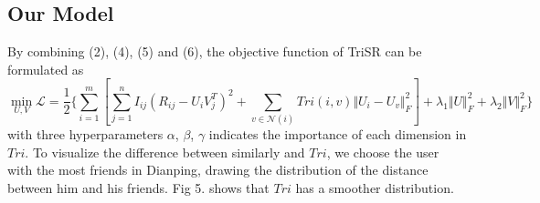 \documentclass{article}
\begin{document}
\subsection{Our Model}
By combining (2), (4), (5) and (6), the objective function of TriSR can be formulated as
\begin{equation}
  \min_{U, V} \mathcal{L} = \frac{1}{2} \{\sum_{i=1}^m [\sum_{j=1}^n I_{ij} (R_{ij} - U_iV_j^T)^2 + \sum_{v \in \mathcal{N}(i)} Tri(i, v) \Vert U_i - U_v \Vert_F^2 ] + \lambda_1 \Vert U \Vert_F^2 + \lambda_2 \Vert V \Vert_F^2 \}
\end{equation}
with three hyperparameters $\alpha$, $\beta$, $\gamma$ indicates the importance of each dimension in $Tri$. 
To visualize the difference between similarly and $Tri$, we choose the user with the most friends in Dianping, drawing the distribution 
of the distance between him and his friends. Fig 5. shows that $Tri$ has a smoother distribution.
\end{document}
